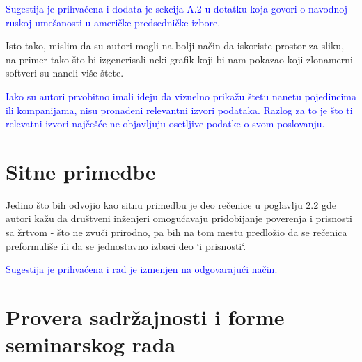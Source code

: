 \documentclass[a4paper]{report}
\newcommand{\odgovor}[1]{\textcolor{blue}{#1}}
\begin{document}
\odgovor{Sugestija je prihvaćena i dodata je sekcija A.2 u dotatku koja govori o navodnoj ruskoj umešanosti u američke predsedničke izbore.}


Isto tako, mislim da su autori mogli na bolji način da iskoriste prostor za sliku, na primer tako što bi izgenerisali neki grafik koji bi nam pokazao koji zlonamerni softveri su naneli više štete.

\odgovor{Iako su autori prvobitno imali ideju da vizuelno prikažu štetu nanetu pojedincima ili kompanijama, nisu pronađeni relevantni izvori podataka. Razlog za to je što ti relevatni izvori najčešće ne objavljuju osetljive podatke o svom poslovanju.}

\section{Sitne primedbe}
Jedino što bih odvojio kao sitnu primedbu je deo rečenice u poglavlju 2.2 gde autori kažu da društveni inženjeri omogućavaju pridobijanje poverenja i prisnosti sa žrtvom - što ne zvuči prirodno, pa bih na tom mestu predložio da se rečenica preformuliše ili da se jednostavno izbaci deo ‘i prisnosti‘.

\odgovor{Sugestija je prihvaćena i rad je izmenjen na odgovarajući način.}



\section{Provera sadržajnosti i forme seminarskog rada}
\end{document}
